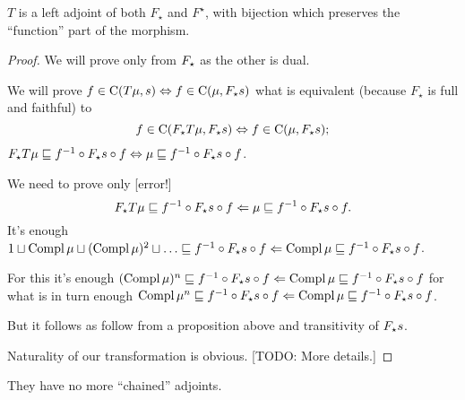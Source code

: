 \begin{thm}
  $T$ is a left adjoint of both $F_{\star}$ and $F^{\star}$, with bijection
  which preserves the ``function'' part of the morphism.
\end{thm}

\begin{proof}
  We will prove only from $F_{\star}$ as the other is dual.
  
  We will prove $f \in \mathrm{C} (T \mu, s) \Leftrightarrow f \in \mathrm{C}
  (\mu, F_{\star} s)$ what is equivalent
  (because $F_{\star}$ is full and faithful) to
  \[ f \in \mathrm{C} (F_{\star} T \mu, F_{\star} s) \Leftrightarrow f \in
     \mathrm{C} (\mu, F_{\star} s) ; \]
  $F_{\star} T \mu \sqsubseteq f^{- 1} \circ F_{\star} s \circ f
  \Leftrightarrow \mu \sqsubseteq f^{- 1} \circ F_{\star} s \circ f$.
  
  We need to prove only [error!]
  \[ F_{\star} T \mu \sqsubseteq f^{- 1} \circ F_{\star} s \circ f \Leftarrow
     \mu \sqsubseteq f^{- 1} \circ F_{\star} s \circ f. \]
  It's enough $1 \sqcup \operatorname{Compl} \mu \sqcup (\operatorname{Compl} \mu)^2 \sqcup
  \ldots \sqsubseteq f^{- 1} \circ F_{\star} s \circ f \Leftarrow \operatorname{Compl}
  \mu \sqsubseteq f^{- 1} \circ F_{\star} s \circ f$.
  
  For this it's enough $(\operatorname{Compl} \mu)^n \sqsubseteq f^{- 1} \circ
  F_{\star} s \circ f \Leftarrow \operatorname{Compl} \mu \sqsubseteq f^{- 1} \circ
  F_{\star} s \circ f$ for what is in turn enough $\operatorname{Compl} \mu^n
  \sqsubseteq f^{- 1} \circ F_{\star} s \circ f \Leftarrow \operatorname{Compl} \mu
  \sqsubseteq f^{- 1} \circ F_{\star} s \circ f$.
  
  But it follows as follow from a proposition above and transitivity of
  $F_{\star} s$.
  
  Naturality of our transformation is obvious. [TODO: More details.]
\end{proof}

\begin{conjecture}
  They have no more ``chained'' adjoints.
\end{conjecture}

